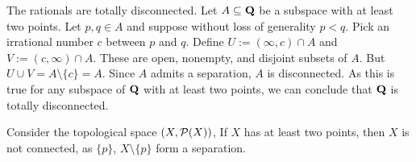 \begin{example}
    The rationals are totally disconnected. Let $A \subseteq \mathbf{Q}$ be a subspace with at least two points. Let $p,q \in A$ and suppose without loss of generality $p < q$. Pick an irrational number $c$ between $p$ and $q$. Define $U:= (\infty,c) \cap A$ and $V:=(c,\infty) \cap A$. These are open, nonempty, and disjoint subsets of $A$. But $U \cup V = A \setminus \{c\} = A$. Since $A$ admits a separation, $A$ is disconnected. As this is true for any subspace of $\mathbf{Q}$ with at least two points, we can conclude that $\mathbf{Q}$ is totally disconnected.
\end{example}

\begin{example}
    Consider the topological space $(X,\mathcal{P}(X))$, If $X$ has at least two points, then $X$ is not connected, as $\{p\}$, $X \setminus \{p\}$ form a separation.
\end{example}

